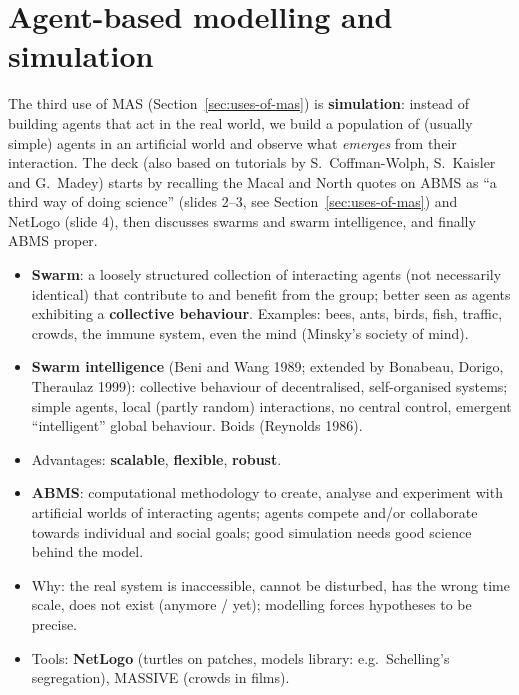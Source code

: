 \section{Agent-based modelling and simulation}
\label{sec:abms}

The third use of MAS (Section~\ref{sec:uses-of-mas}) is \textbf{simulation}: instead of
building agents that act in the real world, we build a population of (usually simple)
agents in an artificial world and observe what \emph{emerges} from their interaction. The
deck (also based on tutorials by S.~Coffman-Wolph, S.~Kaisler and G.~Madey) starts by
recalling the Macal and North quotes on ABMS as ``a third way of doing science''
(slides 2--3, see Section~\ref{sec:uses-of-mas}) and NetLogo (slide 4), then discusses
swarms and swarm intelligence, and finally ABMS proper.




\begin{nbsummary}
\begin{itemize}[nosep]
  \item \textbf{Swarm}: a loosely structured collection of interacting agents (not
        necessarily identical) that contribute to and benefit from the group; better seen as
        agents exhibiting a \textbf{collective behaviour}. Examples: bees, ants, birds, fish,
        traffic, crowds, the immune system, even the mind (Minsky's society of mind).
  \item \textbf{Swarm intelligence} (Beni and Wang 1989; extended by Bonabeau, Dorigo,
        Theraulaz 1999): collective behaviour of decentralised, self-organised systems;
        simple agents, local (partly random) interactions, no central control, emergent
        ``intelligent'' global behaviour. Boids (Reynolds 1986).
  \item Advantages: \textbf{scalable}, \textbf{flexible}, \textbf{robust}.
  \item \textbf{ABMS}: computational methodology to create, analyse and experiment with
        artificial worlds of interacting agents; agents compete and/or collaborate towards
        individual and social goals; good simulation needs good science behind the model.
  \item Why: the real system is inaccessible, cannot be disturbed, has the wrong time scale,
        does not exist (anymore / yet); modelling forces hypotheses to be precise.
  \item Tools: \textbf{NetLogo} (turtles on patches, models library: e.g.\ Schelling's
        segregation), MASSIVE (crowds in films).
\end{itemize}
\end{nbsummary}
